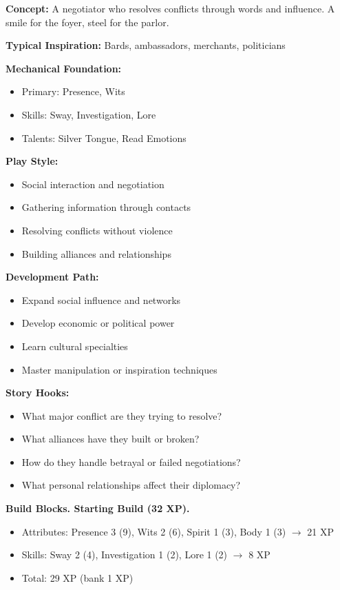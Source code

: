 \documentclass[11pt,twoside,openany]{book}
\begin{document}
\textbf{Concept:} A negotiator who resolves conflicts through words and influence. A smile for the foyer, steel for the parlor.

\textbf{Typical Inspiration:} Bards, ambassadors, merchants, politicians

\textbf{Mechanical Foundation:}
\begin{itemize}
\item Primary: Presence, Wits
\item Skills: Sway, Investigation, Lore
\item Talents: Silver Tongue, Read Emotions
\end{itemize}

\textbf{Play Style:}
\begin{itemize}
\item Social interaction and negotiation
\item Gathering information through contacts
\item Resolving conflicts without violence
\item Building alliances and relationships
\end{itemize}

\textbf{Development Path:}
\begin{itemize}
\item Expand social influence and networks
\item Develop economic or political power
\item Learn cultural specialties
\item Master manipulation or inspiration techniques
\end{itemize}

\textbf{Story Hooks:}
\begin{itemize}
\item What major conflict are they trying to resolve?
\item What alliances have they built or broken?
\item How do they handle betrayal or failed negotiations?
\item What personal relationships affect their diplomacy?
\end{itemize}

\textbf{Build Blocks. Starting Build (32 XP).}
\begin{itemize}
\item Attributes: Presence 3 (9), Wits 2 (6), Spirit 1 (3), Body 1 (3) $\rightarrow$ 21 XP
\item Skills: Sway 2 (4), Investigation 1 (2), Lore 1 (2) $\rightarrow$ 8 XP
\item Total: 29 XP (bank 1 XP)
\end{itemize}
\end{document}
